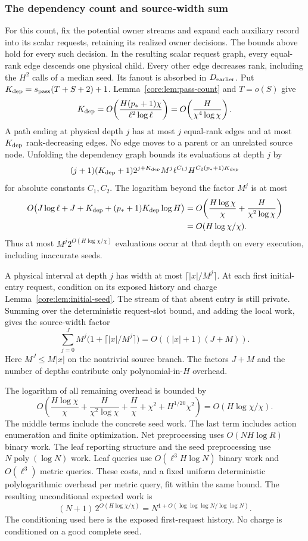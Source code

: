 \documentclass[11pt]{article}
\theoremstyle{definition}
\newcommand{\1}{\mathbf 1}
\begin{document}
\subsubsection{The dependency count and source-width sum}

For this count, fix the potential owner streams and expand each auxiliary
record into its scalar requests, retaining its realized owner decisions.
The bounds above hold for every such decision.
In the resulting scalar request graph, every equal-rank edge descends
one physical child. Every other edge decreases rank, including the
$H^2$ calls of a median seed. Its fanout is absorbed in $D_{\rm earlier}$.
Put $K_{\rm dep}=s_{\rm pass}(T+S+2)+1$.
Lemma~\ref{core:lem:pass-count} and $T=o(S)$ give
\[
 K_{\rm dep}
 =O\!\left(\frac{H(p_*+1)\chi}{\ell^2\log\ell}\right)
 =O\!\left(\frac H{\chi^4\log\chi}\right).
\]
A path ending at physical depth $j$ has at most $j$ equal-rank edges
and at most $K_{\rm dep}$ rank-decreasing edges.
No edge moves to a parent or an unrelated source node.
Unfolding the dependency graph bounds its evaluations at depth
$j$ by
\[
 (j+1)(K_{\rm dep}+1)2^{j+K_{\rm dep}}
 M^j\ell^{C_1j}H^{C_2(p_*+1)K_{\rm dep}}
\]
for absolute constants $C_1,C_2$.
The logarithm beyond the factor $M^j$ is at most
\begin{align*}
 O\bigl(J\log\ell+J+K_{\rm dep}
       +(p_*+1)K_{\rm dep}\log H\bigr)
 &=O\!\left(\frac{H\log\chi}{\chi}
             +\frac H{\chi^2\log\chi}\right)\\
 &=O(H\log\chi/\chi).
\end{align*}
Thus at most $M^j2^{O(H\log\chi/\chi)}$ evaluations occur at that depth
on every execution, including inaccurate seeds.

A physical interval at depth $j$ has width at most
$\lceil|x|/M^j\rceil$.
At each first initial-entry request, condition on its exposed history
and charge Lemma~\ref{core:lem:initial-seed}.
The stream of that absent entry is still private.
Summing over the deterministic request-slot bound, and adding the local
work, gives the source-width factor
\[
 \sum_{j=0}^J M^j\bigl(1+\lceil|x|/M^j\rceil\bigr)
 =O((|x|+1)(J+M)).
\]
Here $M^J\le M|x|$ on the nontrivial source branch.
The factors $J+M$ and the number of depths contribute only
polynomial-in-$H$ overhead.

The logarithm of all remaining overhead is bounded by
\[
 O\!\left(
   \frac{H\log\chi}{\chi}
   +\frac H{\chi^2\log\chi}
   +\frac H\chi+\chi^2+H^{1/20}\chi^2
 \right)
 =O(H\log\chi/\chi).
\]
The middle terms include the concrete seed work.
The last term includes action enumeration and finite optimization.
Net preprocessing uses $O(NH\log R)$ binary work.
The leaf reporting structure and the seed preprocessing use
$N\operatorname{poly}(\log N)$ work.
Leaf queries use $O(\ell^3H\log N)$ binary work and $O(\ell^3)$ metric
queries. These costs, and a fixed uniform deterministic polylogarithmic
overhead per metric query, fit within the same bound.
The resulting unconditional expected work is
\[
 (N+1)\,2^{O(H\log\chi/\chi)}
 =N^{1+O(\log\log\log N/\log\log N)}.
\]
The conditioning used here is the exposed first-request history.
No charge is conditioned on a good complete seed.
\end{document}
